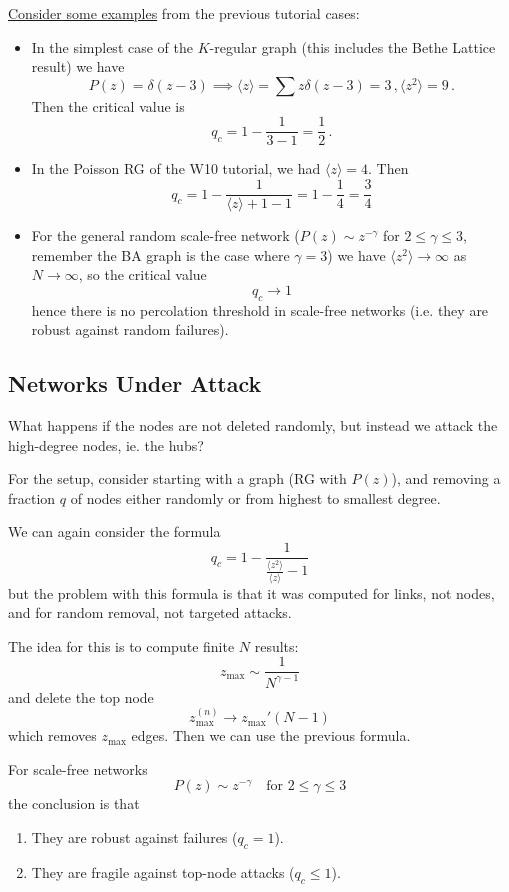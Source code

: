 \documentclass[12pt]{article}
\theoremstyle{definition}
\begin{document}
\underline{Consider some examples} from the previous tutorial cases: 
\begin{itemize}
    \item In the simplest case of the $K$-regular graph (this includes the Bethe Lattice result) we have
    \[ P(z) = \delta(z-3) \implies \langle z\rangle = \sum z\delta(z-3) = 3 \,, \langle z^2\rangle = 9\,.\]
    Then the critical value is 
    \[ q_c= 1-\frac{1}{3-1} = \frac12\,.\]
    \item In the Poisson RG of the W10 tutorial, we had $\langle z\rangle = 4$. Then
    \[
    q_c=1-\frac{1}{\langle z\rangle +1-1}=1-\frac{1}{4}=\frac{3}{4}
    \]
    \item For the general random scale-free network ($P(z)\sim z^{-\gamma}$ for $2\leq \gamma\leq 3$, remember the BA graph is the case where $\gamma=3$) we have $\langle z^2\rangle\to\infty$ as $N\to\infty$, so the critical value
    \[
    q_c\to 1
    \]
    hence there is no percolation threshold in scale-free networks (i.e. they are robust against random failures). 
\end{itemize}


\subsection{Networks Under Attack}

What happens if the nodes are not deleted randomly, but instead we attack the high-degree nodes, ie. the hubs?

For the setup, consider starting with a graph (RG with $P(z)$), and removing a fraction $q$ of nodes either randomly or from highest to smallest degree. 

We can again consider the formula
\[
q_c=1-\frac{1}{\frac{\langle z^2\rangle}{\langle z\rangle}-1}
\]
but the problem with this formula is that it was computed for links, not nodes, and for random removal, not targeted attacks. 

The idea for this is to compute finite $N$ results: 
\[
z_{\max}\sim\frac{1}{N^{\gamma-1}}
\]
and delete the top node
\[
z_{\max}^{(n)}\to z_{\max}'(N-1)
\]
which removes $z_{\max}$ edges. Then we can use the previous formula. 

For scale-free networks
\[
P(z)\sim z^{-\gamma} \quad\text{for }2\leq\gamma\leq 3
\]
the conclusion is that
\begin{enumerate}
    \item They are robust against failures ($q_c=1$). 
    \item They are fragile against top-node attacks ($q_c\leq 1$). 
\end{enumerate}
\end{document}
